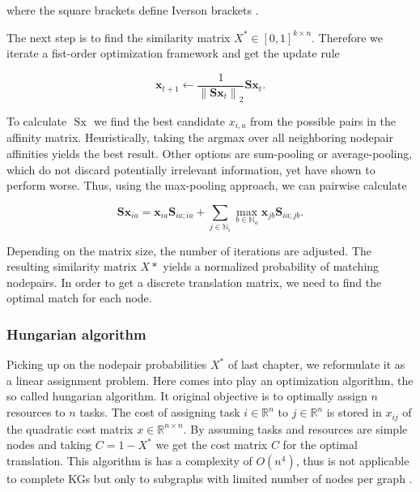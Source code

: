where the square brackets define Iverson brackets \cite{simonovsky_graphvae_2018}.


The next step is to find the similarity matrix $X^* \in[0,1]^{k \times n}$. Therefore we iterate a fist-order optimization framework and get the update rule

\begin{equation}
    \mathbf{x}_{t+1} \leftarrow \frac{1}{\left\|\mathbf{S} \mathbf{x}_{t}\right\|_{2}} \mathbf{S} \mathbf{x}_{t}.
\end{equation}

To calculate $\text { Sx }$ we find the best candidate $x_{i,a}$ from the possible pairs in the affinity matrix. Heuristically, taking the argmax over all neighboring nodepair affinities yields the best result. Other options are sum-pooling or average-pooling, which do not discard potentially irrelevant information, yet have shown to perform worse. Thus, using the max-pooling approach, we can pairwise calculate

\begin{equation}
    \mathbf{Sx}_{i a}=\mathbf{x}_{i a} \mathbf{S}_{i a ; i a}+\sum_{j \in \mathbb{N}_{i}} \max _{b \in \mathbb{N}_{a}} \mathbf{x}_{j b} \mathbf{S}_{i a ; j b}.
\end{equation}

Depending on the matrix size, the number of iterations are adjusted. The resulting similarity matrix $X*$ yields a normalized probability of matching nodepairs. In order to get a discrete translation matrix, we need to find the optimal match for each node.



\subsubsection{Hungarian algorithm}
\label{ssec3:hung}

Picking up on the nodepair probabilities $X^*$ of last chapter, we reformulate it as a linear assignment problem. Here comes into play an optimization algorithm, the so called hungarian algorithm. It original objective is to optimally assign $n$ resources to $n$ tasks. The cost of assigning task $i \in \mathbb{R}^n$ to $j \in \mathbb{R}^n$ is stored in $x_{ij}$ of the quadratic cost matrix $x \in \mathbb{R}^{n \times n}$. By assuming tasks and resources are simple nodes and taking $C=1-X^*$ we get the cost matrix $C$ for the optimal translation. This algorithm is has a complexity of $O\left(n^{4}\right)$, thus is not applicable to complete KGs but only to subgraphs with limited number of nodes per graph \cite{date_gpu-accelerated_2016}.

